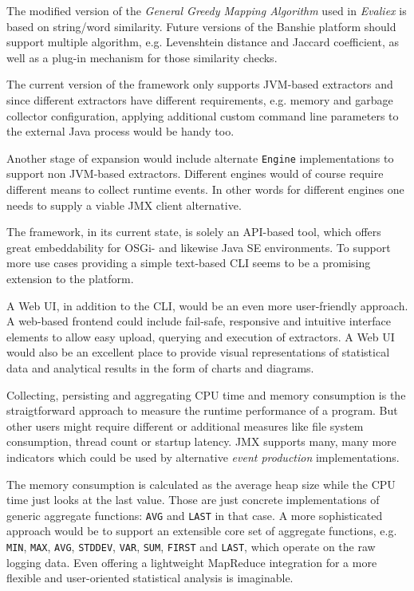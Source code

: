 The modified version of the \textit{General Greedy Mapping Algorithm} used in \textit{Evaliex} is based on string/word similarity. Future versions of the Banshie platform should support multiple algorithm, e.g. Levenshtein distance and Jaccard coefficient, as well as a plug-in mechanism for those similarity checks.


The current version of the framework only supports \gls{JVM}-based extractors and since different extractors have different requirements, e.g. memory and garbage collector configuration, applying additional custom command line parameters to the external Java process would be handy too.

Another stage of expansion would include alternate \texttt{Engine} implementations to support non \gls{JVM}-based extractors. Different engines would of course require different means to collect runtime events. In other words for different engines one needs to supply a viable \gls{JMX} client alternative.

The framework, in its current state, is solely an \gls{API}-based tool, which offers great embeddability for \gls{OSGi}- and likewise Java SE environments. To support more use cases providing a simple text-based \gls{CLI} seems to be a promising extension to the platform.

A Web \gls{UI}, in addition to the \gls{CLI}, would be an even more user-friendly approach. A web-based frontend could include fail-safe, responsive and intuitive interface elements to allow easy upload, querying and execution of extractors. A Web \gls{UI} would also be an excellent place to provide visual representations of statistical data and analytical results in the form of charts and diagrams.

Collecting, persisting and aggregating CPU time and memory consumption is the straigtforward approach to measure the runtime performance of a program. But other users might require different or additional measures like file system consumption, thread count or startup latency. \gls{JMX} supports many, many more indicators which could be used by alternative \textit{event production} implementations.

The memory consumption is calculated as the average heap size while the CPU time just looks at the last value. Those are just concrete implementations of generic aggregate functions: \texttt{AVG} and \texttt{LAST} in that case. A more sophisticated approach would be to support an extensible core set of aggregate functions, e.g. \texttt{MIN}, \texttt{MAX}, \texttt{AVG}, \texttt{STDDEV}, \texttt{VAR}, \texttt{SUM}, \texttt{FIRST} and \texttt{LAST}, which operate on the raw logging data. Even offering a lightweight MapReduce integration for a more flexible and user-oriented statistical analysis is imaginable.
